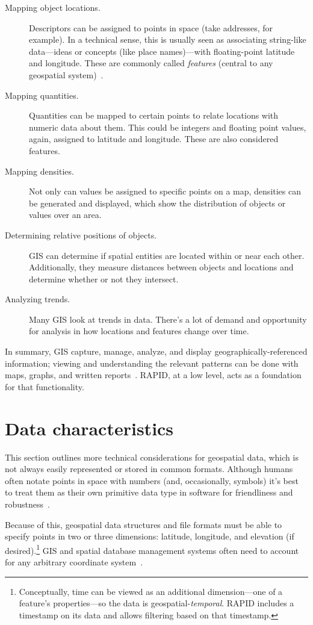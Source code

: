 \begin{description}
  \item[Mapping object locations.] Descriptors can be assigned to points in space (take addresses, for example). In a technical sense, this is usually seen as associating string-like data---ideas or concepts (like place names)---with floating-point latitude and longitude. These are commonly called \textit{features} (central to any geospatial system)~\cite{Kottman2009}.
  \item[Mapping quantities.] Quantities can be mapped to certain points to relate locations with numeric data about them. This could be integers and floating point values, again, assigned to latitude and longitude. These are also considered features.
  \item[Mapping densities.] Not only can values be assigned to specific points on a map, densities can be generated and displayed, which show the distribution of objects or values over an area.
  \item[Determining relative positions of objects.] GIS can determine if spatial entities are located within or near each other. Additionally, they measure distances between objects and locations and determine whether or not they intersect.
  \item[Analyzing trends.] Many GIS look at trends in data. There's a lot of demand and opportunity for analysis in how locations and features change over time.
\end{description}

In summary, GIS capture, manage, analyze, and display geographically-referenced information; viewing and understanding the relevant patterns can be done with maps, graphs, and written reports~\cite{Esriintro}. RAPID, at a low level, acts as a foundation for that functionality.

\section{Data characteristics}
This section outlines more technical considerations for geospatial data, which is not always easily represented or stored in common formats. Although humans often notate points in space with numbers (and, occasionally, symbols) it's best to treat them as their own primitive data type in software for friendliness and robustness~\cite{gentle_intro}.

Because of this, geospatial data structures and file formats must be able to specify points in two or three dimensions: latitude, longitude, and elevation (if desired).\footnote{Conceptually, time can be viewed as an additional dimension---one of a feature's properties---so the data is geospatial-\textit{temporal}. RAPID includes a timestamp on its data and allows filtering based on that timestamp.} GIS and spatial database management systems often need to account for any arbitrary coordinate system~\cite{gentle_intro}.

